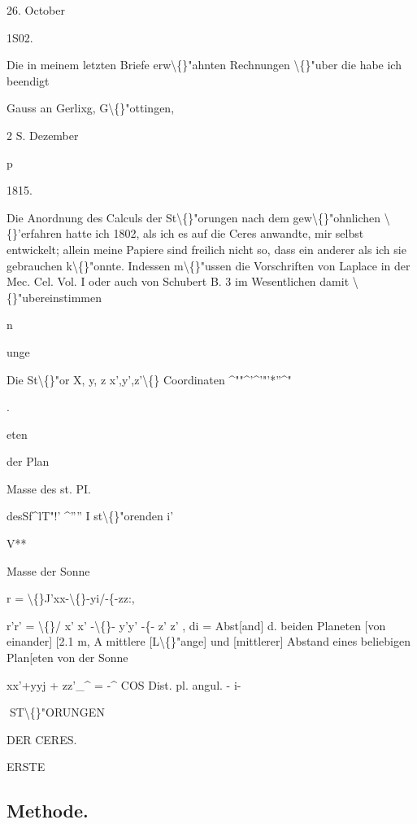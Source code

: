 \documentclass[10pt,a4paper]{article}
\begin{document}
26. October

1S02.

Die in meinem letzten Briefe erw\textbackslash\{\}"ahnten Rechnungen \textbackslash\{\}"uber die
habe ich beendigt

Gauss an Gerlixg, G\textbackslash\{\}"ottingen,

2 S. Dezember

p

1815.

Die Anordnung des Calculs der St\textbackslash\{\}"orungen nach dem gew\textbackslash\{\}"ohnlichen
\textbackslash\{\}'erfahren hatte ich 1802, als ich es auf die Ceres anwandte, mir selbst entwickelt; allein meine Papiere sind freilich nicht so, dass ein anderer als ich
sie gebrauchen k\textbackslash\{\}"onnte. Indessen m\textbackslash\{\}"ussen die Vorschriften von Laplace in der
Mec. Cel. Vol. I oder auch von Schubert B. 3 im Wesentlichen damit \textbackslash\{\}"ubereinstimmen

n

unge

Die St\textbackslash\{\}"or
X, y, z
x',y',z'\textbackslash\{\} Coordinaten
\textasciicircum{}""\textasciicircum{}'\textasciicircum{}'"'*''\textasciicircum{}"

.

eten

der Plan

Masse des st. PI.

desSf\textasciicircum{}lT"!'
\textasciicircum{}'''' I st\textbackslash\{\}"orenden i'

V**

Masse der Sonne

r = \textbackslash\{\}J'xx-\textbackslash\{\}-yi/-\{-zz:,

r'r' = \textbackslash\{\}/ x' x' -\textbackslash\{\}- y'y' -\{- z' z' , di = Abst[and] d. beiden
Planeten [von einander]
[2.1
m, A mittlere [L\textbackslash\{\}"ange] und [mittlerer] Abstand eines beliebigen Plan[eten von
der Sonne

xx'+yyj + zz'\_\textasciicircum{} = -\textasciicircum{} COS Dist. pl. angul. - i-

\newpage
ST\textbackslash\{\}"ORUNGEN

DER CERES.

ERSTE

\subsection*{Methode.}
\end{document}
